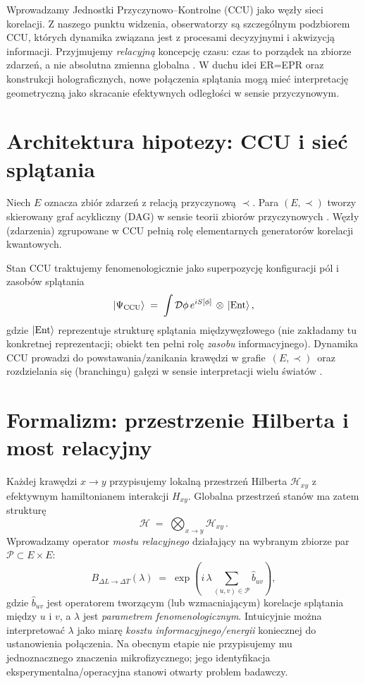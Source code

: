 \documentclass[11pt,a4paper]{article}
\begin{document}
Wprowadzamy Jednostki Przyczynowo--Kontrolne (CCU) jako węzły sieci korelacji. Z naszego punktu widzenia, obserwatorzy są szczególnym podzbiorem CCU, których dynamika związana jest z procesami decyzyjnymi i akwizycją informacji. Przyjmujemy \emph{relacyjną} koncepcję czasu: czas to porządek na zbiorze zdarzeń, a nie absolutna zmienna globalna \cite{Rovelli2004}. W duchu idei ER=EPR \cite{MaldacenaSusskind2013} oraz konstrukcji holograficznych, nowe połączenia splątania mogą mieć interpretację geometryczną jako skracanie efektywnych odległości w sensie przyczynowym.

\section{Architektura hipotezy: CCU i sie\'c splątania}
Niech $E$ oznacza zbiór zdarzeń z relacją przyczynową $\prec$. Para $(E,\prec)$ tworzy skierowany graf acykliczny (DAG) w sensie teorii zbiorów przyczynowych \cite{Sorkin2003}. Węzły (zdarzenia) zgrupowane w CCU pełnią rolę elementarnych generatorów korelacji kwantowych.

Stan CCU traktujemy fenomenologicznie jako superpozycję konfiguracji pól i zasobów splątania
\begin{equation}
\ket{\Psi_{\mathrm{CCU}}} \;=\; \int \mathcal{D}\phi\, e^{i S[\phi]}\, \otimes\, \ket{\mathrm{Ent}},
\end{equation}
gdzie $\ket{\mathrm{Ent}}$ reprezentuje strukturę splątania międzywęzłowego (nie zakładamy tu konkretnej reprezentacji; obiekt ten pełni rolę \emph{zasobu} informacyjnego). Dynamika CCU prowadzi do powstawania/zanikania krawędzi w grafie $\,(E,\prec)\,$ oraz rozdzielania się (branchingu) gałęzi w sensie interpretacji wielu światów \cite{Everett1957}.

\section{Formalizm: przestrzenie Hilberta i most relacyjny}
Każdej krawędzi $x\!\to\!y$ przypisujemy lokalną przestrzeń Hilberta $\mathcal{H}_{xy}$ z efektywnym hamiltonianem interakcji $H_{xy}$. Globalna przestrzeń stanów ma zatem strukturę
\begin{equation}
\mathcal{H} \;=\; \bigotimes_{x\to y} \mathcal{H}_{xy}\,.
\end{equation}
Wprowadzamy operator \emph{mostu relacyjnego} działający na wybranym zbiorze par $\mathcal{P}\subset E\times E$:
\begin{equation}
B_{\Delta L \to \Delta T}(\lambda) \;=\; \exp\!\left(i\,\lambda \sum_{(u,v)\in \mathcal{P}} \hat{b}_{uv}\right),
\end{equation}
gdzie $\hat{b}_{uv}$ jest operatorem tworzącym (lub wzmacniającym) korelacje splątania między $u$ i $v$, a $\lambda$ jest \emph{parametrem fenomenologicznym}. Intuicyjnie można interpretować $\lambda$ jako miarę \emph{kosztu informacyjnego/energii} koniecznej do ustanowienia połączenia. Na obecnym etapie nie przypisujemy mu jednoznacznego znaczenia mikrofizycznego; jego identyfikacja eksperymentalna/operacyjna stanowi otwarty problem badawczy.
\end{document}
